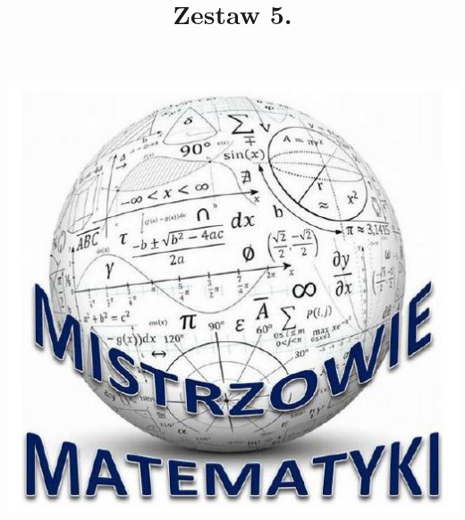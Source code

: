 \documentclass[10pt]{article}
\title{Zestaw 5. }
\author{}
\date{}
\begin{document}
\maketitle
\begin{center}
\includegraphics[max width=\textwidth]{2024_11_21_40fef43eb120b459cab8g-1}
\end{center}
\end{document}

